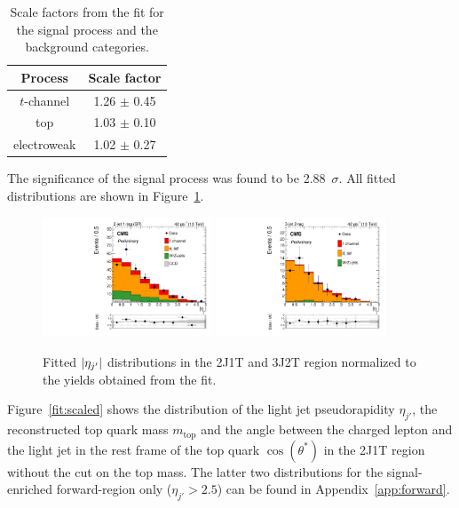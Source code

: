 \begin{table}[!h]
\begin{center}
\caption{\label{tab:fitresult} Scale factors from the fit for the signal process and the background categories.}
\begin{tabular}{c|c}
Process & Scale factor \\
\hline
$t$-channel   & 1.26 $\pm$ 0.45  \\
top        & 1.03 $\pm$ 0.10 \\ 
electroweak    & 1.02 $\pm$ 0.27  \\
\end{tabular}
\end{center}
\end{table} 

The significance of the signal process was found to be 2.88~$\sigma$. All fitted distributions are shown in Figure~\ref{fit:result}.

\begin{figure}[!h]
\begin{center}
\includegraphics[angle=00,width=0.45\textwidth]{figures/postfit2D_MVA_mu2j1t.pdf}
\includegraphics[angle=00,width=0.45\textwidth]{figures/postfit2D_MVA_mu3j2t.pdf}
\caption{\label{fit:result} Fitted $|\eta_{j^\prime}|$ distributions in the 2J1T and 3J2T region normalized to the yields obtained from the fit.}
\end{center}
\end{figure}

Figure~\ref{fit:scaled} shows the distribution of the light jet pseudorapidity $\eta_{j'}$, the reconstructed top quark mass $m_{\text{top}}$ and the angle between the charged lepton and the light jet in the rest frame of the top quark $\cos(\theta^*)$ in the 2J1T region without the cut on the top mass. The latter two distributions for the signal-enriched forward-region only ($\eta_{j'} > 2.5$) can be found in Appendix~\ref{app:forward}.

